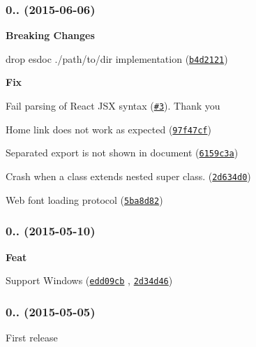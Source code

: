 \subsubsection*{0.. (2015-\/06-\/06)}


\begin{DoxyItemize}
\item {\bfseries Breaking Changes}
\begin{DoxyItemize}
\item drop {\ttfamily esdoc ./path/to/dir} implementation (\href{https://github.com/h13i32maru/esdoc/commit/b4d21219221b8307a155fdee85e2ed5fed9c4429}{\tt b4d2121})
\end{DoxyItemize}
\item {\bfseries Fix}
\begin{DoxyItemize}
\item Fail parsing of React J\+SX syntax (\href{https://github.com/h13i32maru/esdoc/pull/3}{\tt \#3}). Thank you \href{https://github.com/koba04}{\tt }
\item Home link does not work as expected (\href{https://github.com/h13i32maru/esdoc/commit/97f47cf8a8e90cdd6066417fbe9ce835e8a370c8}{\tt 97f47cf})
\item Separated export is not shown in document (\href{https://github.com/h13i32maru/esdoc/commit/6159c3ad28f5c0736d2a2c22f39c94e2e1b6de61}{\tt 6159c3a})
\item Crash when a class extends nested super class. (\href{https://github.com/h13i32maru/esdoc/commit/2d634d06f7a9475e92fae5c0773dfae579b5b314}{\tt 2d634d0})
\item Web font loading protocol (\href{https://github.com/h13i32maru/esdoc/commit/5ba8d82684d84a498e5285c929bbfcccc5ca6013}{\tt 5ba8d82})
\end{DoxyItemize}
\end{DoxyItemize}

\subsubsection*{0.. (2015-\/05-\/10)}


\begin{DoxyItemize}
\item {\bfseries Feat}
\begin{DoxyItemize}
\item Support Windows (\href{https://github.com/h13i32maru/esdoc/commit/edd09cbdf5f4032aa59a5e6e59ab62727475a61a}{\tt edd09cb} , \href{https://github.com/h13i32maru/esdoc/commit/2d34d464f4584820450041bff2e64888b08b5aad}{\tt 2d34d46})
\end{DoxyItemize}
\end{DoxyItemize}

\subsubsection*{0.. (2015-\/05-\/05)}


\begin{DoxyItemize}
\item First release
\end{DoxyItemize}


\begin{DoxyCodeInclude}
\end{DoxyCodeInclude}
 